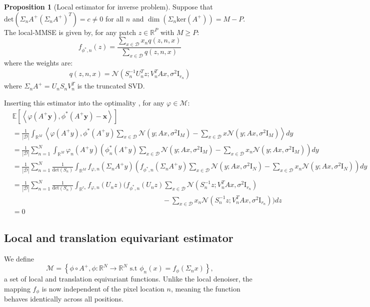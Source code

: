 \documentclass[a4paper,10pt]{article}
\theoremstyle{definition} %
\theoremstyle{definition} %
\newtheorem{proposition}[definition]{Proposition}
\theoremstyle{definition} %
\theoremstyle{definition} %
\newcommand{\R}{\mathbb{R}}
\newcommand{\E}[1]{\mathbb{E} \left[ {#1} \right] }
\newcommand{\Normal}[1]{\mathcal{N}\left( {#1} \right)}
\renewcommand{\ker}[1]{\mathrm{ker}\left( {#1} \right)}
\newcommand{\Id}{\mathrm{I}}
\newcommand{\inner}[1]{\left\langle #1 \right\rangle}
\newcommand{\M}{\mathcal{M}}
\newcommand{\x}{\boldsymbol{x}}
\newcommand{\y}{\boldsymbol{y}}
\newcommand{\0}{\boldsymbol{0}}
\newcommand{\D}{\mathcal{D}}
\renewcommand{\det}[1]{\mathrm{det}\left( #1 \right)}
\begin{document}
\begin{proposition}[Local estimator for inverse problem]
    Suppose that $\det{\Sigma_n A^+ (\Sigma_n A^+)^T} = c \neq 0$ for all $n$ and $\dim(\Sigma_n \ker{A^+}) = M - P$.
    The local-MMSE is given by, for any patch $z \in \R^P$ with $M \geqslant P$: 
    \begin{equation*}
        f_{\phi^*, n}(z) = \frac{\sum_{x \in \D} x_n q(z, n, x)}{\sum_{x \in \D} q(z, n, x)}
    \end{equation*}
    where the weights are: 
    \begin{align*}
        q(z, n, x) = \Normal{S_{n}^{-1} U_{n}^T z; V_{n}^T A x, \sigma^2 \Id_{r_n}}
    \end{align*}
    where $\Sigma_n A^+ = U_n S_n V_n^T$ is the truncated SVD. 
\end{proposition}
Inserting this estimator into the optimality , for any $\varphi \in \M$:
\begin{align*}
    &\E{\inner{\varphi(A^+ \y), \phi^*(A^+  \y) - \x}}  \\
    &=  \frac{1}{|\D|} \int_{\R^M} \inner{\varphi(A^+  y), \phi^*(A^+  y) \sum_{x \in \D} \Normal{y; A x, \sigma^2 \Id_M} - \sum_{x \in \D} x \Normal{y; A x, \sigma^2 \Id_M}} dy \\
    &=  \frac{1}{|\D|} \sum_{n = 1}^{N} \int_{\R^M} \varphi_n (A^+  y) \left( \phi^*_n(A^+  y) \sum_{x \in \D} \Normal{y; A x, \sigma^2 \Id_M} - \sum_{x \in \D} x_n \Normal{y; A x, \sigma^2 \Id_M} \right) dy \\
    &=  \frac{1}{|\D|} \sum_{n = 1}^{N} \frac{1}{\det{S_n}} \int_{\R^M} f_{\varphi, n} (\Sigma_n A^+  y) \left( f_{\phi^*, n}(\Sigma_n A^+  y) \sum_{x \in \D} \Normal{y; A x, \sigma^2 \Id_N} - \sum_{x \in \D} x_n \Normal{y; A x, \sigma^2 \Id_N} \right) dy \\
    \\&= \frac{1}{|\D|} \sum_{n = 1}^{N} \frac{1}{\det{S_n}} \int_{\R^{r_n}} f_{\varphi, n} (U_{n}  z)  \Big(   f_{\phi^*, n}(U_{n}  z) \sum_{x \in \D} \Normal{S_{n}^{-1} z; V_{n}^T A x, \sigma^2 \Id_{r_n}} \\
    &\hspace{9cm} - \sum_{x \in \D} x_n \Normal{S_{n}^{-1} z; V_{n}^T A x, \sigma^2 \Id_{r_n}} \Big) dz
    \\&= 0
\end{align*}

\subsection{Local and translation equivariant estimator}
We define
\begin{equation}
    \M = \left\{\phi \circ A^+, \phi: \R^N \to \R^N \mbox{ s.t } \phi_n(x) = f_{\phi}(\Sigma_n x)\right\},
\end{equation}
a set of local and translation equivariant functions. Unlike the local denoiser, the mapping $f_{\phi}$ is now independent of the pixel location $n$, meaning the function behaves identically across all positions.
\end{document}
